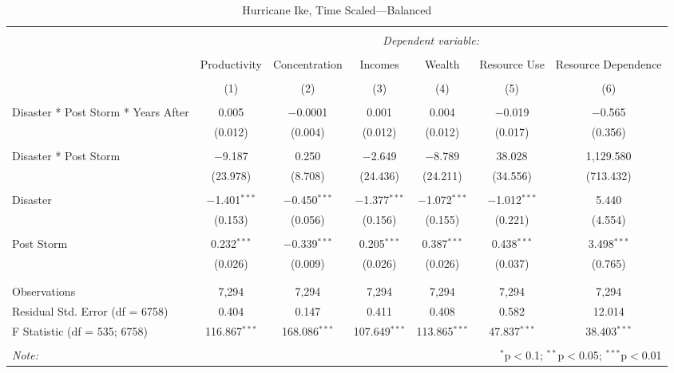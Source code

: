
\begin{table}[!htbp] \centering 
  \caption{Hurricane Ike, Time Scaled---Balanced} 
  \label{} 
\footnotesize 
\begin{tabular}{@{\extracolsep{5pt}}lcccccc} 
\\[-1.8ex]\hline 
\hline \\[-1.8ex] 
 & \multicolumn{6}{c}{\textit{Dependent variable:}} \\ 
\cline{2-7} 
\\[-1.8ex] & Productivity & Concentration & Incomes & Wealth & Resource Use & Resource Dependence \\ 
\\[-1.8ex] & (1) & (2) & (3) & (4) & (5) & (6)\\ 
\hline \\[-1.8ex] 
 Disaster * Post Storm * Years After & 0.005 & $-$0.0001 & 0.001 & 0.004 & $-$0.019 & $-$0.565 \\ 
  & (0.012) & (0.004) & (0.012) & (0.012) & (0.017) & (0.356) \\ 
  & & & & & & \\ 
 Disaster * Post Storm & $-$9.187 & 0.250 & $-$2.649 & $-$8.789 & 38.028 & 1,129.580 \\ 
  & (23.978) & (8.708) & (24.436) & (24.211) & (34.556) & (713.432) \\ 
  & & & & & & \\ 
 Disaster & $-$1.401$^{***}$ & $-$0.450$^{***}$ & $-$1.377$^{***}$ & $-$1.072$^{***}$ & $-$1.012$^{***}$ & 5.440 \\ 
  & (0.153) & (0.056) & (0.156) & (0.155) & (0.221) & (4.554) \\ 
  & & & & & & \\ 
 Post Storm & 0.232$^{***}$ & $-$0.339$^{***}$ & 0.205$^{***}$ & 0.387$^{***}$ & 0.438$^{***}$ & 3.498$^{***}$ \\ 
  & (0.026) & (0.009) & (0.026) & (0.026) & (0.037) & (0.765) \\ 
  & & & & & & \\ 
\hline \\[-1.8ex] 
Observations & 7,294 & 7,294 & 7,294 & 7,294 & 7,294 & 7,294 \\ 
Residual Std. Error (df = 6758) & 0.404 & 0.147 & 0.411 & 0.408 & 0.582 & 12.014 \\ 
F Statistic (df = 535; 6758) & 116.867$^{***}$ & 168.086$^{***}$ & 107.649$^{***}$ & 113.865$^{***}$ & 47.837$^{***}$ & 38.403$^{***}$ \\ 
\hline 
\hline \\[-1.8ex] 
\textit{Note:}  & \multicolumn{6}{r}{$^{*}$p$<$0.1; $^{**}$p$<$0.05; $^{***}$p$<$0.01} \\ 
\end{tabular} 
\end{table} 
